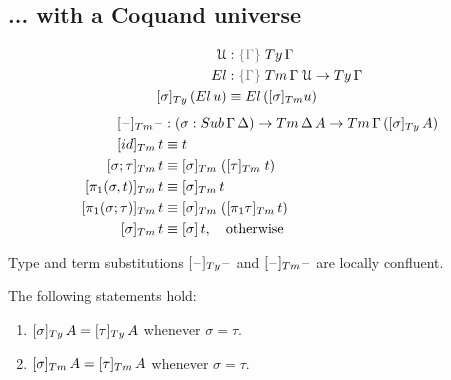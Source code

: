 \documentclass[a4paper,UKenglish,numberwithinsect,cleveref,thm-restate]{lipics-v2021}
\newcommand{\danger}{\marginpar[\hfill\dbend]{\dbend\hfill}}
\begin{document}
\subsection{... with a Coquand universe} \label{subsec:SC+U}
\cite{Coquand2013}
\begin{alignat*}{3}
  \UU  & : \implicit{\Gamma}\;\Ty\, \Gamma \\
  \El & : \implicit{\Gamma}\;\Tm\,\Gamma\;\UU \to \Ty\,\Gamma \\
  [ \sigma ]_{\Ty}\,(\El\, u) & \jdeq \El\,([\sigma]_{\Tm}{u}) \\
\end{alignat*}
\begin{alignat*}{3}
  [\blank]_{\Tm}\blank & : (\sigma : \Sub\,\Gamma\,\Delta) \to \Tm\,\Delta\,A \to \Tm\,\Gamma\,([\sigma]_{\Ty}\,A) \\
[ \idS ]_{\Tm}\,t          & \jdeq t \\
[ \sigma ; \tau ]_{\Tm}\,t & \jdeq [ \sigma ]_{\Tm}\;([ \tau ]_{\Tm}\;t) \\
[ \pi_1(\sigma, t) ]_{\Tm}\,t & \jdeq [\sigma]_\Tm\,t \\
[ \pi_1(\sigma; \tau) ]_{\Tm}\,t & \jdeq [\sigma]_\Tm\; ([\pi_1\tau]_\Tm \,t) \\
[ \sigma ]_{\Tm}\,t        & \jdeq [ \sigma ]\,t, \quad \text{otherwise}  \\
\end{alignat*}

\begin{proposition}
  Type and term substitutions $[\blank]_{\Ty}\blank$ and $[\blank]_{\Tm}\blank$ are locally confluent.
  \danger
\end{proposition}

\begin{proposition}[Coherence]
  The following statements hold:
  \danger
  \begin{enumerate}
    \item $[\sigma]_{\Ty}\,A = [\tau]_{\Ty}\,A$ whenever $\sigma = \tau$.
    \item $[\sigma]_{\Tm}\,A = [\tau]_{\Tm}\,A$ whenever $\sigma = \tau$.
  \end{enumerate}
\end{proposition}
\end{document}
